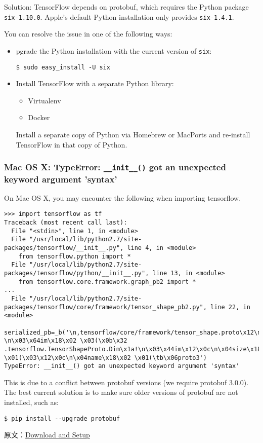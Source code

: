Solution: TensorFlow depends on protobuf, which requires the Python package \lstinline{six-1.10.0}. Apple's default Python installation only provides \lstinline{six-1.4.1}.

You can resolve the issue in one of the following ways:
\begin{itemize}
\item pgrade the Python installation with the current version of \lstinline{six}:
\begin{lstlisting}
$ sudo easy_install -U six
\end{lstlisting}

\item Install TensorFlow with a separate Python library:
  \begin{itemize}
  \item Virtualenv
  \item Docker
  \end{itemize}
Install a separate copy of Python via Homebrew or MacPorts and re-install TensorFlow in that copy of Python.
\end{itemize}




\subsubsection {Mac OS X: TypeError: \lstinline{__init__()} got an unexpected keyword argument 'syntax'}

On Mac OS X, you may encounter the following when importing tensorflow.

\begin{lstlisting}
>>> import tensorflow as tf
Traceback (most recent call last):
  File "<stdin>", line 1, in <module>
  File "/usr/local/lib/python2.7/site-packages/tensorflow/__init__.py", line 4, in <module>
    from tensorflow.python import *
  File "/usr/local/lib/python2.7/site-packages/tensorflow/python/__init__.py", line 13, in <module>
    from tensorflow.core.framework.graph_pb2 import *
...
  File "/usr/local/lib/python2.7/site-packages/tensorflow/core/framework/tensor_shape_pb2.py", line 22, in <module>
    serialized_pb=_b('\n,tensorflow/core/framework/tensor_shape.proto\x12\ntensorflow\"d\n\x10TensorShapeProto\x12-\n\x03\x64im\x18\x02 \x03(\x0b\x32 .tensorflow.TensorShapeProto.Dim\x1a!\n\x03\x44im\x12\x0c\n\x04size\x18\x01 \x01(\x03\x12\x0c\n\x04name\x18\x02 \x01(\tb\x06proto3')
TypeError: __init__() got an unexpected keyword argument 'syntax'
\end{lstlisting}

This is due to a conflict between protobuf versions (we require protobuf 3.0.0). The best current solution is to make sure older versions of protobuf are not installed, such as:

\begin{lstlisting}
$ pip install --upgrade protobuf
\end{lstlisting}


原文：\href{http://tensorflow.org/get_started/os_setup.md}{Download and Setup}
